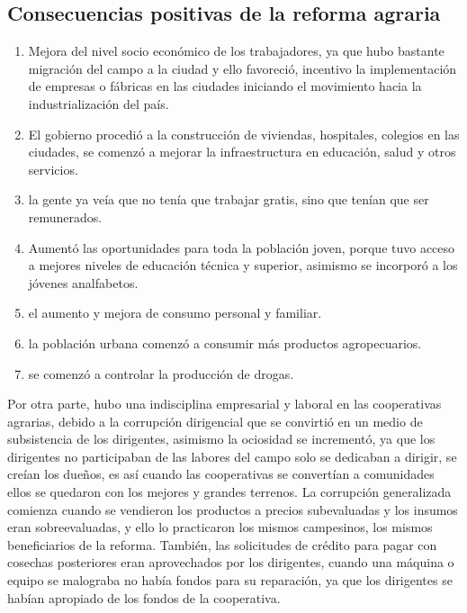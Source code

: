 \documentclass[
  a4paper,
]{article}
\begin{document}
\hypertarget{consecuencias-positivas-de-la-reforma-agraria}{%
\subsection{Consecuencias positivas de la reforma
agraria}\label{consecuencias-positivas-de-la-reforma-agraria}}

\begin{enumerate}
\def\labelenumi{\arabic{enumi}.}
\item
  Mejora del nivel socio económico de los trabajadores, ya que hubo
  bastante migración del campo a la ciudad y ello favoreció, incentivo
  la implementación de empresas o fábricas en las ciudades iniciando el
  movimiento hacia la industrialización del país.
\item
  El gobierno procedió a la construcción de viviendas, hospitales,
  colegios en las ciudades, se comenzó a mejorar la infraestructura en
  educación, salud y otros servicios.
\item
  la gente ya veía que no tenía que trabajar gratis, sino que tenían que
  ser remunerados.
\item
  Aumentó las oportunidades para toda la población joven, porque tuvo
  acceso a mejores niveles de educación técnica y superior, asimismo se
  incorporó a los jóvenes analfabetos.
\item
  el aumento y mejora de consumo personal y familiar.
\item
  la población urbana comenzó a consumir más productos agropecuarios.
\item
  se comenzó a controlar la producción de drogas.
\end{enumerate}

Por otra parte, hubo una indisciplina empresarial y laboral en las
cooperativas agrarias, debido a la corrupción dirigencial que se
convirtió en un medio de subsistencia de los dirigentes, asimismo la
ociosidad se incrementó, ya que los dirigentes no participaban de las
labores del campo solo se dedicaban a dirigir, se creían los dueños, es
así cuando las cooperativas se convertían a comunidades ellos se
quedaron con los mejores y grandes terrenos. La corrupción generalizada
comienza cuando se vendieron los productos a precios subevaluadas y los
insumos eran sobreevaluadas, y ello lo practicaron los mismos
campesinos, los mismos beneficiarios de la reforma. También, las
solicitudes de crédito para pagar con cosechas posteriores eran
aprovechados por los dirigentes, cuando una máquina o equipo se
malograba no había fondos para su reparación, ya que los dirigentes se
habían apropiado de los fondos de la cooperativa.
\end{document}
